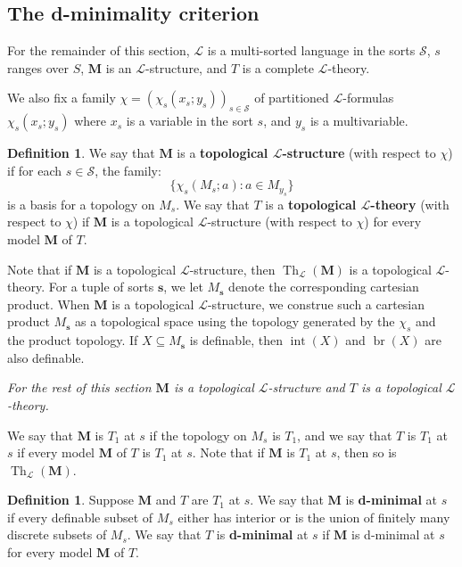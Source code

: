 \documentclass[11pt]{amsart}
\theoremstyle{plain}
\theoremstyle{definition}
\newtheorem{definition}[thm]{Definition}
\numberwithin{equation}{section}
\newcommand\calL{\mathcal{L}}
\newcommand\0{\varnothing}
\begin{document}
\subsection{The d-minimality criterion}\label{d_minimality_criterion_statement_subsection}
For the remainder of this section, $\calL$ is a multi-sorted language in the sorts $\mathcal{S}$, $s$ ranges over $S$, $\bm{M}$ is an $\calL$-structure, and $T$ is a complete $\calL$-theory. 

\medskip\noindent
We also fix a family $\chi=(\chi_s(x_s;y_s))_{s\in\mathcal{S}}$ of partitioned $\mathcal{L}$-formulas $\chi_s(x_s;y_s)$ where $x_s$ is a variable in the sort $s$, and $y_s$ is a multivariable.

\begin{definition}
We say that $\bm{M}$ is a \textbf{topological $\mathcal{L}$-structure} (with respect to $\chi$) if for each $s\in\mathcal{S}$, the family:
\[
\{\chi_s(M_s;a):a\in M_{y_s}\}
\]
is a basis for a topology on $M_s$. 
We say that $T$ is a \textbf{topological $\calL$-theory} (with respect to $\chi$) if $\bm{M}$ is a topological $\calL$-structure (with respect to $\chi$) for every model $\bm{M}$ of $T$.
\end{definition}

\noindent
Note that if $\bm{M}$ is a topological $\calL$-structure, then $\operatorname{Th}_{\calL}(\bm{M})$ is a topological $\calL$-theory. 
For a tuple of sorts $\bm{s}$, we let $M_{\bm{s}}$ denote the corresponding cartesian product. When $\bm{M}$ is a topological $\calL$-structure, we construe such a cartesian product $M_{\bm{s}}$ as a topological space using the topology generated by the $\chi_s$ and the product topology. 
If $X\subseteq M_{\bm{s}}$ is definable, then $\operatorname{int}(X)$ and $\operatorname{br}(X)$ are also definable.


\medskip\noindent
\emph{For the rest of this section $\bm{M}$ is a topological $\calL$-structure and $T$ is a topological $\calL$-theory.} 

\medskip\noindent
We say that $\bm{M}$ is $T_1$ at $s$ if the topology on $M_s$ is $T_1$, and we say that $T$ is $T_1$ at $s$ if every model $\bm{M}$ of $T$ is $T_1$ at $s$. Note that if $\bm{M}$ is $T_1$ at $s$, then so is $\operatorname{Th}_{\calL}(\bm{M})$.

\begin{definition}\label{d_minimality_def_new}
Suppose $\bm{M}$ and $T$ are $T_1$ at $s$. We say that $\bm{M}$ is \textbf{d-minimal} at $s$ if every definable subset of $M_s$ either has interior or is the union of finitely many discrete subsets of $M_s$. We say that $T$ is \textbf{d-minimal} at $s$ if $\bm{M}$ is d-minimal at $s$ for every model $\bm{M}$ of $T$.
\end{definition}
\end{document}

